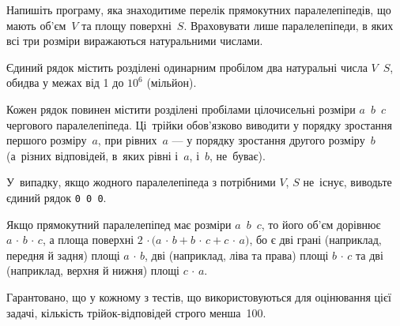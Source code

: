 ﻿Напишіть програму, яка знаходитиме перелік прямокутних паралелепіпедів, що мають об'єм~$V$ та площу поверхні~$S$. Враховувати лише паралелепіпеди, в яких всі три розміри виражаються натуральними числами.

\InputFile
Єдиний рядок містить розділені одинарним пробілом два натуральні числа $V$~$S$, обидва у межах від 1 до $10^6$ (мільйон).

\OutputFile
Кожен рядок повинен містити розділені пробілами цілочисельні розміри $a$~$b$~$c$ чергового паралелепіпеда. Ці~трійки обов'язково виводити у порядку зростання першого розміру~$a$, при рівних~$a$ --- у порядку зростання др{\it у}гого розміру~$b$ (а~різних відповідей, в~яких рівні і~$a$, і~$b$, не~буває). 

У~випадку, якщо жодного паралелепіпеда з потрібними $V$, $S$ не~існує, виводьте єдиний рядок \texttt{0~0~0}.

\Note
Якщо прямокутний паралелепіпед має розміри $a$~$b$~$c$, то його об'єм дорівнює ${a\,{\cdot}\,b\,{\cdot}\,c}$, а площа поверхні ${2\,{\cdot}\bigl(a\,{\cdot}\,b}+{b\,{\cdot}\,c}+{c\,{\cdot}\,a}\bigr)$, 
бо є 
дві грані (наприклад, передня й задня) площі ${a\,{\cdot}\,b}$, 
дві (наприклад, ліва та права) площі ${b\,{\cdot}\,c}$ 
та
дві (наприклад, верхня й нижня) площі ${c\,{\cdot}\,a}$.

Гарантовано, що у кожному з тестів, що використовуються для оцінювання цієї задачі, кількість трійок-відповідей строго менша~100.

\Examples
\begin{example}
%
%
%
%
\end{example}